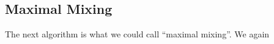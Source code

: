 
\subsection{Maximal Mixing}\label{sec:maximal-mixing}

The next algorithm is what we could call \enquote{maximal mixing}. We again 


